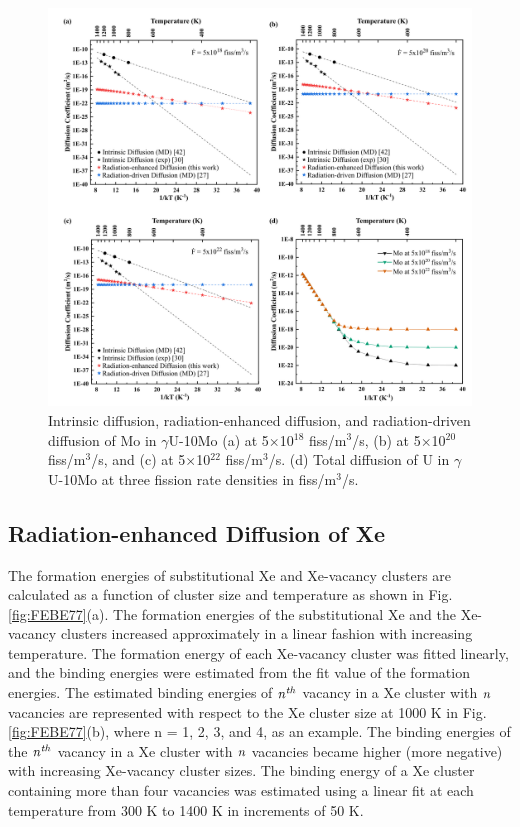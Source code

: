 \documentclass[preprint,12pt]{elsarticle}
\begin{document}
\begin{figure}[hbt!]
\centering
\includegraphics[width=1\textwidth]{Fig6.png}
\caption{Intrinsic diffusion, radiation-enhanced diffusion, and radiation-driven diffusion of Mo in $\gamma$U-10Mo (a) at 5$\times$10$^{18}$ fiss/m$^{3}$/s, (b) at 5$\times$10$^{20}$ fiss/m$^{3}$/s, and (c) at 5$\times$10$^{22}$ fiss/m$^{3}$/s. (d) Total diffusion of U in $\gamma$U-10Mo at three fission rate densities in fiss/m$^{3}$/s.}
\label{fig:eachMo}
\end{figure}

\FloatBarrier

\subsection{Radiation-enhanced Diffusion of Xe}
The formation energies of substitutional Xe and Xe-vacancy clusters are calculated as a function of cluster size and temperature as shown in Fig. \ref{fig:FEBE77}(a). The formation energies of the substitutional Xe and the Xe-vacancy clusters increased approximately in a linear fashion with increasing temperature. The formation energy of each Xe-vacancy cluster was fitted linearly, and the binding energies were estimated from the fit value of the formation energies. The estimated binding energies of $\it{n}^{th}$ vacancy in a Xe cluster with $\it{n}$ vacancies are represented with respect to the Xe cluster size at 1000 K in Fig. \ref{fig:FEBE77}(b), where n = 1, 2, 3, and 4, as an example. The binding energies of the $\it{n}^{th}$ vacancy in a Xe cluster with $\it{n}$ vacancies became higher (more negative) with increasing Xe-vacancy cluster sizes. The binding energy of a Xe cluster containing more than four vacancies was estimated using a linear fit at each temperature from 300 K to 1400 K in increments of 50 K. 
\end{document}
